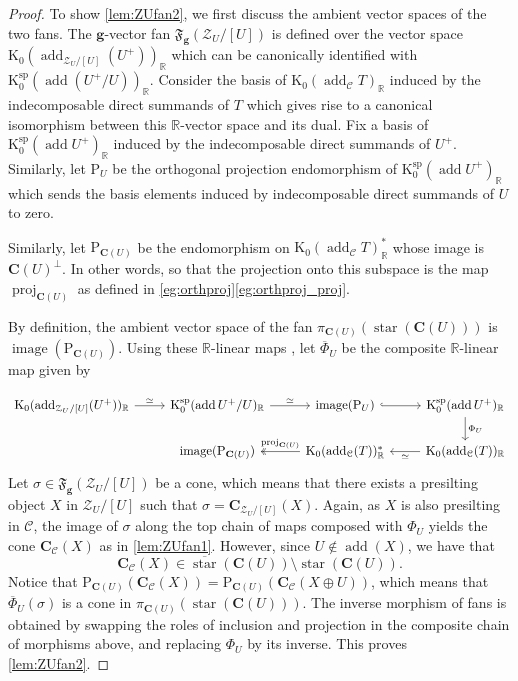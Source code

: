 \documentclass[10pt,twoside, a4paper,reqno]{amsart}
\DeclareMathOperator{\add}{add}
\DeclareMathOperator{\proj}{proj}
\DeclareMathOperator{\starr}{star}
\DeclareMathOperator{\image}{image}
\newcommand{\partfan}[1]{\mathfrak{F}_{\bfg}(#1)}
\newcommand{\R}{\mathbb{R}}
\newcommand{\calC}{\mathcal{C}}
\newcommand{\calZ}{\mathcal{Z}}
\newcommand{\boldC}{\mathbf{C}}
\newcommand{\K}{\mathrm{K}}
\newcommand{\Ksp}{\mathrm{K}^{\mathrm{sp}}}
\newcommand{\bfg}{\mathbf{g}}
\theoremstyle{definition}
\begin{document}
\begin{proof}
	To show \eqref{lem:ZUfan2}, we first discuss the ambient vector spaces of the two fans. The $\bfg$-vector fan $\partfan{\calZ_U/[U]}$ {is defined over} the vector space $\K_0(\add_{\calZ_U/[U]}(U^+))_\R$ which can be canonically identified with $\Ksp_0(\add (U^+/U))_\R$. Consider the basis of $\K_0(\add_{\calC} T)_\R$ induced by the indecomposable direct summands of $T$ which gives rise to a canonical isomorphism between this $\R$-vector space and its dual. Fix a basis of $\Ksp_0(\add U^+)_\R$ induced by the indecomposable direct summands of $U^+$. Similarly, let $\mathrm{P}_U$ be the orthogonal projection endomorphism of $\Ksp_0(\add U^+)_\R$ which sends the basis elements induced by indecomposable direct summands of $U$ to zero. {Similarly, let $\mathrm{P}_{\boldC(U)}$ be the endomorphism on $\K_0(\add_{\calC} T)_\R^*$ whose image is $\boldC(U)^\perp$. In other words, so that the projection onto this subspace is the map $\proj_{\boldC(U)}$ as defined in \cref{eg:orthproj}\eqref{eg:orthproj_proj}.
	
	By definition, the ambient vector space of the fan $\pi_{\boldC(U)}(\starr(\boldC(U)))$ is $\image (\mathrm{P}_{\boldC(U)})$. Using {these $\R$-linear maps} , let $\overline{\Phi}_U$ be the composite $\R$-linear map given by}
	\[
	\begin{tikzcd}
	\K_0(\add_{\calZ_U/[U]}(U^+))_\R \arrow[r, "\simeq"] & \Ksp_0(\add U^+/U)_\R \arrow[r, "\simeq"] & \image(\mathrm{P}_U) \arrow[r,  hookrightarrow] & \Ksp_0(\add U^+)_\R \arrow[d, "\Phi_U"] \\
	& \image (\mathrm{P}_{\boldC(U)}) & \K_0(\add_{\calC}(T))_\R^* \arrow[l, twoheadrightarrow, "{{\proj_{\boldC(U)}}}",swap] & \K_0(\add_{\calC}( T))_\R \arrow[l, "\simeq"]
	\end{tikzcd} \]
	Let $\sigma \in \partfan{\calZ_U/[U]}$ be a cone, which means that there exists a presilting object $X$ in $\calZ_U/[U]$ such that $\sigma = \boldC_{\calZ_U/[U]}(X)$. Again, as $X$ is also presilting in $\calC$, the image of $\sigma$ along the top chain of maps composed with $\Phi_U$ yields the cone $\boldC_{\calC}(X)$ as in \eqref{lem:ZUfan1}. However, since $U \not \in \add(X)$, we have that 
	\[ \boldC_{\calC}(X) \in \overline{\starr}(\boldC(U)) \setminus \starr(\boldC(U)). \]
	Notice that $\mathrm{P}_{\boldC(U)}(\boldC_{\calC}(X)) = \mathrm{P}_{\boldC(U)}(\boldC_{\calC}(X \oplus U))$, which means that $\overline{\Phi}_U(\sigma)$ is a cone in $\pi_{\boldC(U)}(\starr(\boldC(U)))$. The inverse morphism of fans is obtained by swapping the roles of inclusion and projection in the composite chain of morphisms above, and replacing $\Phi_U$ by its inverse. This proves \eqref{lem:ZUfan2}.
\end{proof}
\end{document}
